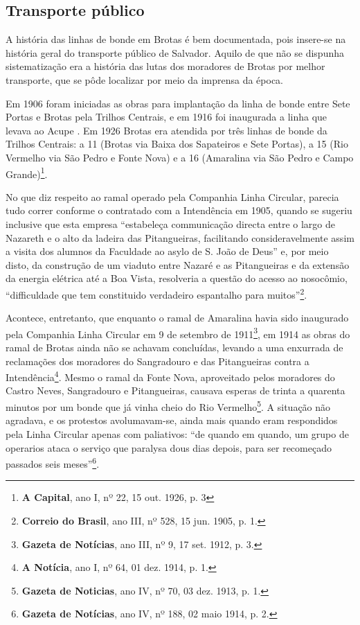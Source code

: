 \subsection{Transporte público}

A história das linhas de bonde em Brotas é bem documentada, pois insere-se na história geral do transporte público de Salvador. Aquilo de que não se dispunha sistematização era a história das lutas dos moradores de Brotas por melhor transporte, que se pôde localizar por meio da imprensa da época.


Em 1906 foram iniciadas as obras para implantação da linha de bonde entre Sete Portas e Brotas pela Trilhos Centrais, e em 1916 foi inaugurada a linha que levava ao Acupe \cite[p.~299]{VASCONCELOS2002}. Em 1926 Brotas era atendida por três linhas de bonde da Trilhos Centrais: a 11 (Brotas via Baixa dos Sapateiros e Sete Portas), a 15 (Rio Vermelho via São Pedro e Fonte Nova) e a 16 (Amaralina via São Pedro e Campo Grande)\footnote{\textbf{A Capital}, ano I, nº 22, 15 out. 1926, p. 3}.

No que diz respeito ao ramal operado pela Companhia Linha Circular, parecia tudo correr conforme o contratado com a Intendência em 1905, quando se sugeriu inclusive que esta empresa ``estabeleça communicação directa entre o largo de Nazareth e o alto da ladeira das Pitangueiras, facilitando consideravelmente assim a visita dos alumnos da Faculdade ao asylo de S. João de Deus'' e, por meio disto, da construção de um viaduto entre Nazaré e as Pitangueiras e da extensão da energia elétrica até a Boa Vista, resolveria a questão do acesso ao nosocômio, ``difficuldade que tem constituido verdadeiro espantalho para muitos''\footnote{\textbf{Correio do Brasil}, ano III, nº 528, 15 jun. 1905, p. 1.}. 

Acontece, entretanto, que enquanto o ramal de Amaralina havia sido inaugurado pela Companhia Linha Circular em 9 de setembro de 1911\footnote{\textbf{Gazeta de Notícias}, ano III, nº 9, 17 set. 1912, p. 3.}, em 1914 as obras do ramal de Brotas ainda não se achavam concluídas, levando a uma enxurrada de reclamações dos moradores do Sangradouro e das Pitangueiras contra a Intendência\footnote{\textbf{A Notícia}, ano I, nº 64, 01 dez. 1914, p. 1.}. Mesmo o ramal da Fonte Nova, aproveitado pelos moradores do Castro Neves, Sangradouro e Pitangueiras, causava esperas de trinta a quarenta minutos por um bonde que já vinha cheio do Rio Vermelho\footnote{\textbf{Gazeta de Noticias}, ano IV, nº 70, 03 dez. 1913, p. 1.}. A situação não agradava, e os protestos avolumavam-se, ainda mais quando eram respondidos pela Linha Circular apenas com paliativos: ``de quando em quando, um grupo de operarios ataca o serviço que paralysa dous dias depois, para ser recomeçado passados seis meses''\footnote{\textbf{Gazeta de Notícias}, ano IV, nº 188, 02 maio 1914, p. 2.}. 

